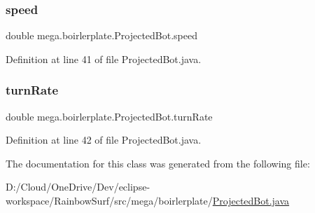 \subsubsection{\texorpdfstring{speed}{speed}}
{\footnotesize\ttfamily double mega.\+boirlerplate.\+Projected\+Bot.\+speed\hspace{0.3cm}{\ttfamily [private]}}



Definition at line 41 of file Projected\+Bot.\+java.

\mbox{\label{classmega_1_1boirlerplate_1_1_projected_bot_af8779f0a2c73029ae591f841dab2feea}} 
\subsubsection{\texorpdfstring{turn\+Rate}{turnRate}}
{\footnotesize\ttfamily double mega.\+boirlerplate.\+Projected\+Bot.\+turn\+Rate\hspace{0.3cm}{\ttfamily [private]}}



Definition at line 42 of file Projected\+Bot.\+java.



The documentation for this class was generated from the following file\+:\begin{DoxyCompactItemize}
\item 
D\+:/\+Cloud/\+One\+Drive/\+Dev/eclipse-\/workspace/\+Rainbow\+Surf/src/mega/boirlerplate/\hyperlink{_projected_bot_8java}{Projected\+Bot.\+java}\end{DoxyCompactItemize}
